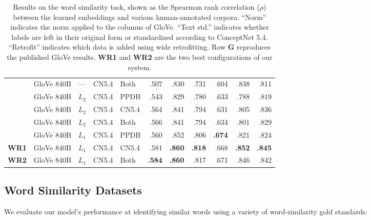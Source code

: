 \documentclass[11pt,letterpaper]{article}
\begin{document}
\begin{table*}[t]
\begin{tabular}{lllllrrrrrr}
       &GloVe 840B   & ---   & CN5.4     & Both     &     .507 &     .830 &      .731 &      .604 &     .838 &     .811 \\
       &GloVe 840B   & $L_2$ & CN5.4     & PPDB     &     .543 &     .829 &      .780 &      .633 &     .788 &     .819 \\
       &GloVe 840B   & $L_2$ & CN5.4     & CN5.4    &     .564 &     .841 &      .794 &      .631 &     .805 &     .836 \\
       &GloVe 840B   & $L_2$ & CN5.4     & Both     &     .566 &     .841 &      .794 &      .634 &     .801 &     .829 \\
       &GloVe 840B   & $L_1$ & CN5.4     & PPDB     &     .560 &     .852 &      .806 & {\bf .674}&     .821 &     .824 \\
\bf WR1&GloVe 840B   & $L_1$ & CN5.4     & CN5.4    &     .581 &{\bf .860}& {\bf .818}&      .668 &{\bf .852}&{\bf .845}\\
\bf WR2&GloVe 840B   & $L_1$ & CN5.4     & Both     &{\bf .584}&{\bf .860}&      .817 &      .671 &     .846 &     .842 \\
\bottomrule
\end{tabular}

\caption{
    Results on the word similarity task, shown as the Spearman rank correlation
    ($\rho$) between the learned embeddings and various human-annotated corpora.
    ``Norm'' indicates the norm applied to the columns of GloVe.
    ``Text std.'' indicates whether labels are left in their original form or
    standardized according to ConceptNet 5.4. ``Retrofit'' indicates which data
    is added using wide retrofitting.
    Row {\bf G} reproduces the published GloVe results.
    {\bf WR1} and {\bf WR2} are the two best configurations of our system.
}
\label{eval-bigtable}
\end{table*}

\subsection{Word Similarity Datasets}

We evaluate our model's performance at identifying similar words using a
variety of word-similarity gold standards:
\end{document}
